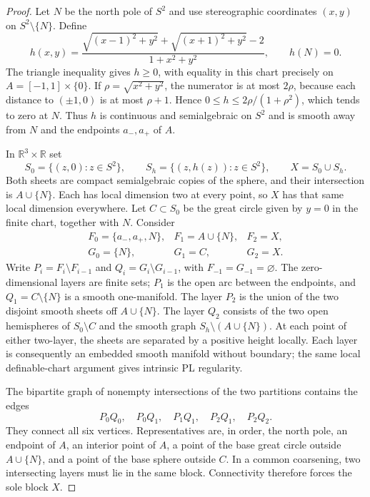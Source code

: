 \begin{proof}
Let $N$ be the north pole of $S^2$ and use stereographic coordinates
$(x,y)$ on $S^2\setminus\{N\}$.  Define
\[
 h(x,y)=
 \frac{\sqrt{(x-1)^2+y^2}+\sqrt{(x+1)^2+y^2}-2}
 {1+x^2+y^2},\qquad h(N)=0.
\]
The triangle inequality gives $h\ge0$, with equality in this chart
precisely on $A=[-1,1]\times\{0\}$.  If
$\rho=\sqrt{x^2+y^2}$, the numerator is at most $2\rho$,
because each distance to $(\pm1,0)$ is at most $\rho+1$.
Hence $0\le h\le2\rho/(1+\rho^2)$, which tends to zero at
$N$.  Thus $h$ is continuous and semialgebraic on $S^2$ and is
smooth away from $N$ and the endpoints $a_-,a_+$ of $A$.

In $\mathbb R^3\times\mathbb R$ set
\[
 S_0=\{(z,0):z\in S^2\},\qquad
 S_h=\{(z,h(z)):z\in S^2\},\qquad X=S_0\cup S_h.
\]
Both sheets are compact semialgebraic copies of the sphere, and
their intersection is $A\cup\{N\}$.  Each has local dimension two
at every point, so $X$ has that same local dimension everywhere.
Let $C\subset S_0$ be the great circle given by $y=0$ in the
finite chart, together with $N$.  Consider
\[
 \begin{array}{lll}
 F_0=\{a_-,a_+,N\},& F_1=A\cup\{N\},& F_2=X,\\
 G_0=\{N\},&G_1=C,&G_2=X.
 \end{array}
\]
Write $P_i=F_i\setminus F_{i-1}$ and
$Q_i=G_i\setminus G_{i-1}$, with $F_{-1}=G_{-1}=\varnothing$.
The zero-dimensional layers are finite sets; $P_1$ is the open
arc between the endpoints, and $Q_1=C\setminus\{N\}$ is a smooth
one-manifold.  The layer $P_2$ is the union of the two disjoint
smooth sheets off $A\cup\{N\}$.  The layer $Q_2$ consists of the
two open hemispheres of $S_0\setminus C$ and the smooth graph
$S_h\setminus(A\cup\{N\})$.  At each point of either two-layer,
the sheets are separated by a positive height locally.  Each layer
is consequently an embedded smooth manifold without boundary;
the same local definable-chart argument gives intrinsic PL
regularity.

The bipartite graph of nonempty intersections of the two partitions
contains the edges
\[
 P_0Q_0,\quad P_0Q_1,\quad P_1Q_1,
 \quad P_2Q_1,\quad P_2Q_2.
\]
They connect all six vertices.  Representatives are, in order, the
north pole, an endpoint of $A$, an interior point of $A$, a point
of the base great circle outside $A\cup\{N\}$, and a point of the
base sphere outside $C$.  In a common coarsening, two intersecting
layers must lie in the same block.  Connectivity therefore forces
the sole block $X$.


\end{proof}
